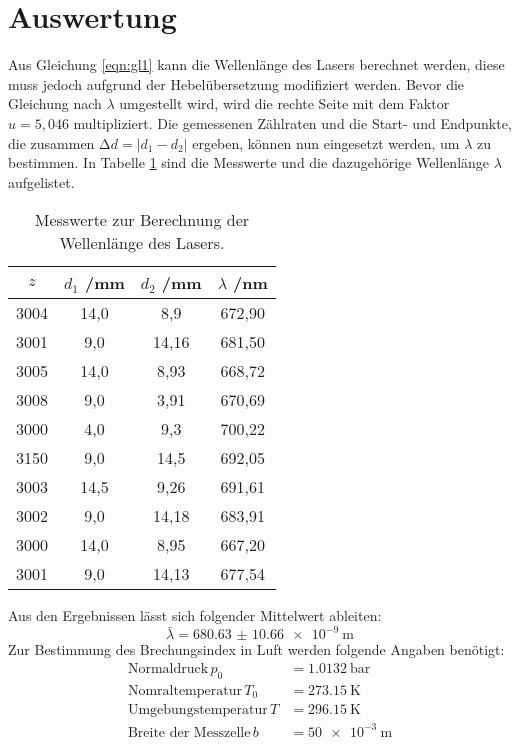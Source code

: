 \section{Auswertung}
\label{sec:Auswertung}

Aus Gleichung \eqref{eqn:gl1} kann die Wellenlänge des Lasers berechnet werden, diese muss jedoch aufgrund der Hebelübersetzung modifiziert werden.
Bevor die Gleichung nach $\lambda$ umgestellt wird, wird die rechte Seite mit dem Faktor $u = 5,046$ multipliziert.
Die gemessenen Zählraten und die Start- und Endpunkte, die zusammen $\increment d = |d_1-d_2|$ ergeben, können nun eingesetzt werden, um $\lambda$ zu bestimmen.
In Tabelle \ref{tab:welle} sind die Messwerte und die dazugehörige Wellenlänge $\lambda$ aufgelistet.
\begin{table}
  \centering
  \caption{Messwerte zur Berechnung der Wellenlänge des Lasers.}
  \label{tab:welle}
  \begin{tabular}{c c c c}
    \toprule
    $z$ & $d_1$ /\si{\milli\meter} & $d_2$ /\si{\milli\meter} & $\lambda$ /\si{\nano\meter} \\
    \midrule
    3004 & 14,0 &   8,9 & 672,90 \\
    3001 &  9,0 & 14,16 & 681,50 \\
    3005 & 14,0 &  8,93 & 668,72 \\
    3008 &  9,0 &  3,91 & 670,69 \\
    3000 &  4,0 &   9,3 & 700,22 \\
    3150 &  9,0 &  14,5 & 692,05 \\
    3003 & 14,5 &  9,26 & 691,61 \\
    3002 &  9,0 & 14,18 & 683,91 \\
    3000 & 14,0 &  8,95 & 667,20 \\
    3001 &  9,0 & 14,13 & 677,54 \\
    \bottomrule
  \end{tabular}
\end{table}
\FloatBarrier
Aus den Ergebnissen lässt sich folgender Mittelwert ableiten:
\begin{equation*}
  \bar \lambda = \SI{680.63(1066)e-9}{\meter}
\end{equation*}
Zur Bestimmung des Brechungsindex in Luft werden folgende Angaben benötigt:
\begin{align*}
  \text{Normaldruck} \, p_0 &= \SI{1.0132}{\bar} \\
  \text{Nomraltemperatur} \, T_0 &= \SI{273.15}{\kelvin} \\
  \text{Umgebungstemperatur} \, T &= \SI{296.15}{\kelvin} \\
  \text{Breite der Messzelle} \, b &= \SI{50e-3}{\meter} \\
\end{align*}
